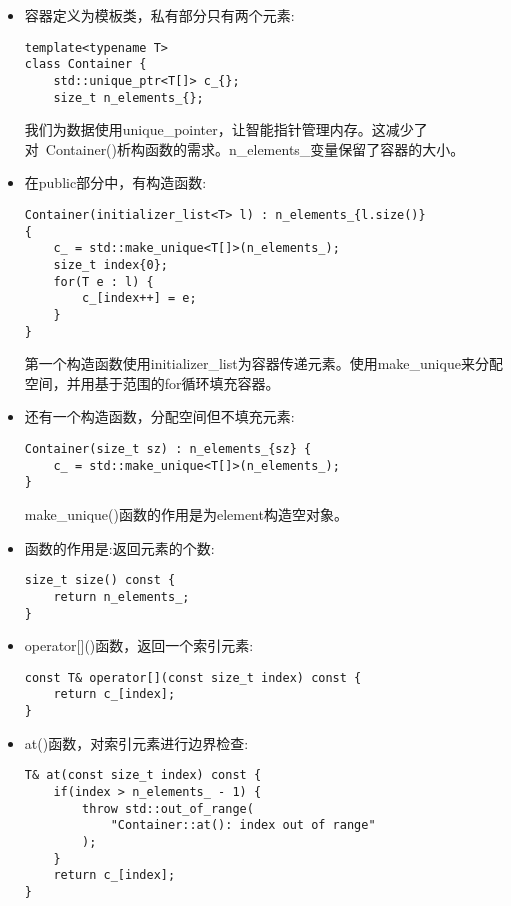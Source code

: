 \begin{itemize}
\item 
容器定义为模板类，私有部分只有两个元素:

\begin{lstlisting}[style=styleCXX]
template<typename T>
class Container {
	std::unique_ptr<T[]> c_{};
	size_t n_elements_{};
\end{lstlisting}

我们为数据使用unique\_pointer，让智能指针管理内存。这减少了对~Container()析构函数的需求。n\_elements\_变量保留了容器的大小。

\item 
在public部分中，有构造函数:

\begin{lstlisting}[style=styleCXX]
Container(initializer_list<T> l) : n_elements_{l.size()}
{
	c_ = std::make_unique<T[]>(n_elements_);
	size_t index{0};
	for(T e : l) {
		c_[index++] = e;
	}
}
\end{lstlisting}

第一个构造函数使用initializer\_list为容器传递元素。使用make\_unique来分配空间，并用基于范围的for循环填充容器。

\item 
还有一个构造函数，分配空间但不填充元素:

\begin{lstlisting}[style=styleCXX]
Container(size_t sz) : n_elements_{sz} {
	c_ = std::make_unique<T[]>(n_elements_);
}
\end{lstlisting}

make\_unique()函数的作用是为element构造空对象。

\item 
函数的作用是:返回元素的个数:

\begin{lstlisting}[style=styleCXX]
size_t size() const {
	return n_elements_;
}
\end{lstlisting}

\item 
operator[]()函数，返回一个索引元素:

\begin{lstlisting}[style=styleCXX]
const T& operator[](const size_t index) const {
	return c_[index];
}
\end{lstlisting}

\item 
at()函数，对索引元素进行边界检查:

\begin{lstlisting}[style=styleCXX]
T& at(const size_t index) const {
	if(index > n_elements_ - 1) {
		throw std::out_of_range(
			"Container::at(): index out of range"
		);
	}
	return c_[index];
}
\end{lstlisting}


\end{itemize}
